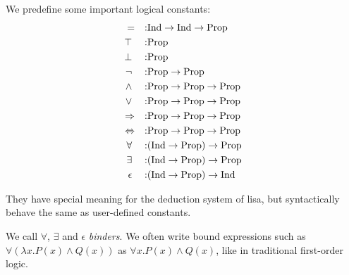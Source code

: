 \begin{definition}[Constants]
  We predefine some important logical constants:
  \begin{align*}
    = \quad: & \text{Ind} \rightarrow \text{Ind} \rightarrow \text{Prop} \\
    \top \quad: & \text{Prop} \\
    \bot \quad: & \text{Prop} \\
    \neg \quad: & \text{Prop} \rightarrow \text{Prop} \\
    \land \quad: & \text{Prop} \rightarrow \text{Prop} \rightarrow \text{Prop} \\
    \lor \quad: & \text{Prop} \rightarrow \text{Prop} \rightarrow \text{Prop} \\
    \Rightarrow \quad: & \text{Prop} \rightarrow \text{Prop} \rightarrow \text{Prop} \\
    \Leftrightarrow \quad: & \text{Prop} \rightarrow \text{Prop} \rightarrow \text{Prop} \\
    \forall \quad: & (\text{Ind} \rightarrow \text{Prop}) \rightarrow \text{Prop} \\
    \exists \quad: & (\text{Ind} \rightarrow \text{Prop}) \rightarrow \text{Prop} \\
    \epsilon \quad: & (\text{Ind} \rightarrow \text{Prop}) \rightarrow \text{Ind}
  \end{align*}

  They have special meaning for the deduction system of lisa, but syntactically behave the same as user-defined constants.

  We call $\forall$, $\exists$ and $\epsilon$ \textit{binders}. We often write bound expressions such as $\forall(\lambda x. P(x) \land Q(x))$ as $\forall x. P(x) \land Q(x)$, like in traditional first-order logic.
\end{definition}

